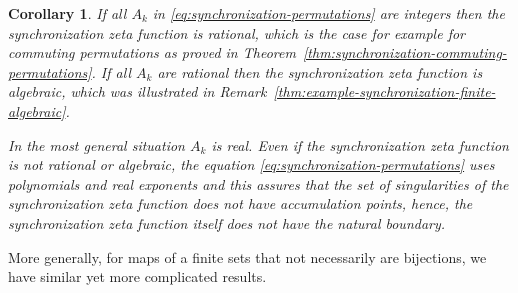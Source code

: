 \documentclass[oneside]{amsart}
\newtheorem{col}[thm]{Corollary}
\begin{document}
\begin{col} \label{thm:synchronization-zeta-finite-bijections-col}
  If all $A_k$ in \eqref{eq:synchronization-permutations} are integers then the synchronization zeta function
  is rational, which is the case for example for \emph{commuting} permutations
  as proved in {\rm Theorem~\ref{thm:synchronization-commuting-permutations}}.
  If all $A_k$ are rational then the synchronization zeta function is algebraic,
  which was illustrated in {\rm Remark~\ref{thm:example-synchronization-finite-algebraic}}.

  In the most general situation $A_k$ is real. Even if the synchronization zeta function is not rational or algebraic,
  the equation \eqref{eq:synchronization-permutations} uses polynomials and real exponents and this
  assures that the set of singularities of the synchronization zeta function does not have accumulation points,
  hence, the synchronization zeta function itself does not have the natural boundary.
\end{col}




More generally, for maps of a finite sets that not necessarily are bijections,
we have similar yet more complicated results.
\end{document}
